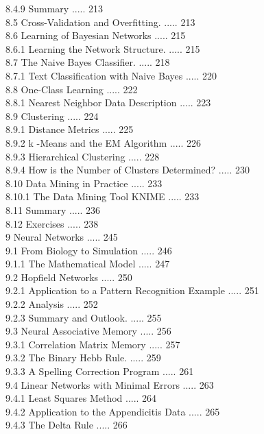 \documentclass[10pt]{book}
\begin{document}
8.4.9 Summary ..... 213\\
8.5 Cross-Validation and Overfitting. ..... 213\\
8.6 Learning of Bayesian Networks ..... 215\\
8.6.1 Learning the Network Structure. ..... 215\\
8.7 The Naive Bayes Classifier. ..... 218\\
8.7.1 Text Classification with Naive Bayes ..... 220\\
8.8 One-Class Learning ..... 222\\
8.8.1 Nearest Neighbor Data Description ..... 223\\
8.9 Clustering ..... 224\\
8.9.1 Distance Metrics ..... 225\\
8.9.2 k -Means and the EM Algorithm ..... 226\\
8.9.3 Hierarchical Clustering ..... 228\\
8.9.4 How is the Number of Clusters Determined? ..... 230\\
8.10 Data Mining in Practice ..... 233\\
8.10.1 The Data Mining Tool KNIME ..... 233\\
8.11 Summary ..... 236\\
8.12 Exercises ..... 238\\
9 Neural Networks ..... 245\\
9.1 From Biology to Simulation ..... 246\\
9.1.1 The Mathematical Model ..... 247\\
9.2 Hopfield Networks ..... 250\\
9.2.1 Application to a Pattern Recognition Example ..... 251\\
9.2.2 Analysis ..... 252\\
9.2.3 Summary and Outlook. ..... 255\\
9.3 Neural Associative Memory ..... 256\\
9.3.1 Correlation Matrix Memory ..... 257\\
9.3.2 The Binary Hebb Rule. ..... 259\\
9.3.3 A Spelling Correction Program ..... 261\\
9.4 Linear Networks with Minimal Errors ..... 263\\
9.4.1 Least Squares Method ..... 264\\
9.4.2 Application to the Appendicitis Data ..... 265\\
9.4.3 The Delta Rule ..... 266\\
\end{document}
